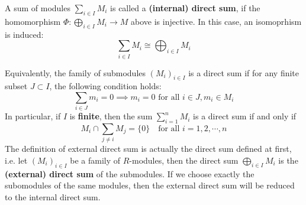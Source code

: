 \documentclass[12pt,a4paper]{article}
\begin{document}
\begin{definition}
    A sum of modules \(\sum_{i \in I} M_i\) is called a \textbf{(internal) direct sum}, if the homomorphism \(\Phi: \bigoplus_{i \in I}M_i \to M\) above is injective. In this case, an isomoprhism is induced:
    \[\sum_{i \in I} M_i \cong \bigoplus_{i \in I}M_i\]
\end{definition}

\begin{remark}
    Equivalently, the family of submodules \((M_i)_{i \in I}\) is a direct sum if for any finite subset \(J \subset I\), the following condition holds:
    \[\sum_{i \in J} m_i = 0 \implies m_i = 0 \text{ for all } i \in J, m_i \in M_i\]
    In particular, if \(I\) is \textbf{finite}, then the sum \(\sum_{i=1}^n M_i\) is a direct sum if and only if
    \[M_i \cap \sum_{j \neq i}M_j = \{0\} \quad \text{for all } i=1,2,\cdots,n\]
    The definition of external direct sum is actually the direct sum defined at first, i.e. let \((M_i)_{i \in I}\) be a family of \(R\)-modules, then the direct sum \(\bigoplus_{i \in I} M_i\) is the \textbf{(external) direct sum} of the submodules. If we choose exactly the subomodules of the same modules, then the external direct sum will be reduced to the internal direct sum.
\end{remark}
\end{document}
